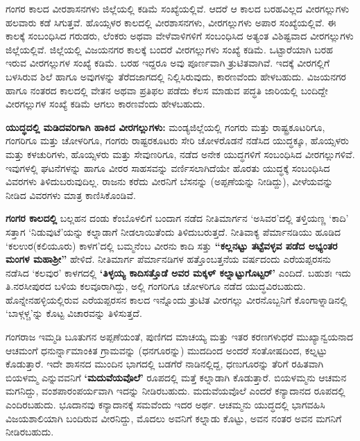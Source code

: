 ಗಂಗರ ಕಾಲದ ವೀರಶಾಸನಗಳು ಜಿಲ್ಲೆಯಲ್ಲಿ ಕಡಿಮೆ ಸಂಖ್ಯೆಯಲ್ಲಿವೆ. ಆದರೆ ಆ ಕಾಲದ ಬರಹವಿಲ್ಲದ ವೀರಗಲ್ಲುಗಳು ಹಲವಾರು ಕಡೆ ಸಿಗುತ್ತವೆ. ಹೊಯ್ಸಳರ ಕಾಲದಲ್ಲಿ ವೀರಶಾಸನಗಳು, ವೀರಗಲ್ಲುಗಳು ಅಪಾರ ಸಂಖ್ಯೆಯಲ್ಲಿವೆ. ಈ ಕಾಲಕ್ಕೆ ಸಂಬಂಧಿಸಿದ ಗರುಡರು, ಲೆಂಕರು ಅಥವಾ ವೇಳೆವಾಳಿಗಳಿಗೆ ಸಂಬಂಧಿಸಿದ ಅತ್ಯಂತ ವಿಶಿಷ್ಟವಾದ ವೀರಗಲ್ಲುಗಳು ಜಿಲ್ಲೆಯಲ್ಲಿವೆ. ಜಿಲ್ಲೆಯಲ್ಲಿ ವಿಜಯನಗರ ಕಾಲಕ್ಕೆ ಬಂದರೆ ವೀರಗಲ್ಲುಗಳು ಸಂಖ್ಯೆ ಕಡಿಮೆ. ಒಟ್ಟಾರೆಯಾಗಿ ಬರಹ ಇರುವ ವೀರಗಲ್ಲುಗಳ ಸಂಖ್ಯೆ ಕಡಿಮೆ. ಬರಹ ಇದ್ದರೂ ಅವು ಪೂರ್ಣವಾಗಿ ತ್ರುಟಿತವಾಗಿವೆ. ಇದಕ್ಕೆ ವೀರಗಲ್ಲಿಗೆ ಬಳಸಿರುವ \hbox{ಶಿಲೆ} ಹಾಗೂ ಅವುಗಳನ್ನು ತೆರೆದಜಾಗದಲ್ಲಿ ನಿಲ್ಲಿಸಿರುವುದು, ಕಾರಣವೆಂದು ಹೇಳಬಹುದು. ವಿಜಯನಗರ ಹಾಗೂ ನಂತರದ ಕಾಲದಲ್ಲಿ ವೇತನ ಅಥವಾ ಪ್ರತಿಫಲ ಪಡೆದು ಕೆಲಸ ಮಾಡುವ ಪದ್ಧತಿ ಜಾರಿಯಲ್ಲಿ ಬಂದಿದ್ದೇ ವೀರಗಲ್ಲುಗಳ ಸಂಖ್ಯೆ ಕಡಿಮೆ ಆಗಲು ಕಾರಣವೆಂದು ಹೇಳಬಹುದು.

\newpage

\textbf{ಯುದ್ಧದಲ್ಲಿ ಮಡಿದವರಿಗಾಗಿ ಹಾಕಿದ ವೀರಗಲ್ಲುಗಳು:} ಮಂಡ್ಯಜಿಲ್ಲೆಯಲ್ಲಿ ಗಂಗರು ಮತ್ತು ರಾಷ್ಟ್ರಕೂಟರಿಗೂ, ಗಂಗರಿಗೂ ಮತ್ತು ಚೋಳರಿಗೂ, ಗಂಗರು ರಾಷ್ಟರಕೂಟರು ಸೇರಿ ಚೋಳರೊಡನೆ ನಡೆಸಿದ ಯುದ್ಧಕ್ಕೂ, ಹೊಯ್ಸಳರು ಮತ್ತು ಕಳಚುರಿಗಳು, ಹೊಯ್ಸಳರು ಮತ್ತು ಸೇವುಣರಿಗೂ, ನಡೆದ ಅನೇಕ ಯುದ್ಧಗಳಿಗೆ ಸಂಬಂಧಿಸಿದ ವೀರಗಲ್ಲುಗಳಿವೆ. ಇವುಗಳಲ್ಲಿ ಘಟನೆಗಳನ್ನು ಹಾಗೂ ವೀರರ ಸಾಹಸವನ್ನು ವರ್ಣಿಸಲಾಗಿದೆಯೇ ಹೊರತು ಯುದ್ಧಕ್ಕೆ ಸಂಬಂಧಿಸಿದ ವಿವರಗಳು ತಿಳಿದುಬರುವುದಿಲ್ಲ. ರಾಜನು ಕರೆದು ವೀರನಿಗೆ ಬೆಸನನ್ನು (ಅಪ್ಪಣೆಯನ್ನು ನೀಡಿದ್ದು), ವೀಳೆಯವನ್ನು ನೀಡಿದ ವಿವರಗಳು ಮಾತ್ರ ಕಾಣಿಸಿಕೊಂಡಿವೆ.

\textbf{ಗಂಗರ ಕಾಲದಲ್ಲಿ} ಬಲ್ಲಹನ ದಂಡು ಕೆಂಬೊಳಲಿಗೆ ಬಂದಾಗ ನಡೆದ ನೀತಿಮಾರ್ಗನ ‘ಅಸಿವರ’ದಲ್ಲಿ ತಳ್ತಿಯಣ್ಣ ‘ಕಾದಿ’ ಸತ್ತಾಗ ‘ನಿಡುವುಟೆ’ಯನ್ನು ಕಲ್ನಾಡಾಗೆ ನೀಡಲಾಯಿತೆಂದು ತಿಳಿದುಬರುತ್ತದೆ. ನೀತಿವಾಕ್ಯ ಪೆರ್ಮಾನಡಿಯು ಹೂಡಿದ ‘ಕಲಉರ(ಕಲಿಯೂರು) ಕಾಳಗ’ದಲ್ಲಿ ಬಮ್ಮನೆಂಬ ವೀರನು ಕಾದಿ ಸತ್ತು \textbf{“ಕಲ್ಲನಟ್ಟು ತಟ್ಟೆವಳ್ಳವ ಪಡೆದ ಅಭ್ಯಂತರ ಮಂಗಳ ಮಹಾಶ‍್ರೀ”} ಹೇಳಿದೆ. ನೀತಿಮಾರ್ಗ ಪೆರ್ಮಾನಡಿಗಳ ಹತ್ತೊಂಬತ್ತನೆಯ ವರ್ಷದಂದು ಎರೆಯಪ್ಪರಸನು ನಡೆಸಿದ ‘ಕಲವುರ’ ಕಾಳಗದಲ್ಲಿ \textbf{‘ತಿಳ್ಳಯ್ಯ ಕಾದಿಸತ್ತೊಡೆ ಅವರ ಮಕ್ಕಳ್​ ಕಲ್ನಾಟ್ಟುಗೊಟ್ಟರ್​’} ಎಂದಿದೆ. ಬಹುಶಃ ಇದು ತಿ.ನರಸೀಪುರದ ಬಳಿಯ ಕಲವೂರಾಗಿದ್ದು, ಅಲ್ಲಿ ಗಂಗರಿಗೂ ಚೋಳರಿಗೂ ನಡೆದ ಯುದ್ಧವಿರಬಹುದು. ಹೊನ್ನೇನಹಳ್ಳಿಯಲ್ಲಿರುವ ಎರೆಯಪ್ಪರಸನ ಕಾಲದ ಇನ್ನೊಂದು ತ್ರುಟಿತ ವೀರಗಲ್ಲು ವೀರನೊಬ್ಬನಿಗೆ ಕೊಂಗಾಳ್ನಾಡಿನಲ್ಲಿ ‘ಬಾಳ್ಗಳ್ಚ’ನ್ನು ಕೊಟ್ಟ ವಿಚಾರವನ್ನು ತಿಳಿಸುತ್ತದೆ.

ಗಂಗರಾಜ ಇಮ್ಮಡಿ ಬೂತುಗನ ಅಪ್ಪಣೆಯಂತೆ, ಪುಣಿಗದ ಮಾಚಯ್ಯ ಮತ್ತು ಇತರ ಕರಣಗಳು\break ಧರೆ ಮುಖ್ಯಾನ್ವಯನಾದ ಆಚಮಂಗೆ ಧನುರ್ನ್ನಾಮಾಂಕಿತ ಗ್ರಾಮವನ್ನು (ಧನಗೂರನ್ನು) ಮುದದಿಂದ ಅಂದರೆ ಸಂತೋಷದಿಂದ, ಕಲ್ನಟ್ಟು ಕೊಡುತ್ತಾರೆ. ಇದೇ ಶಾಸನದ ಮುಂದಿನ ಭಾಗದಲ್ಲಿ ಬಡಗೆರೆ ನಾಡಿನಲ್ಲಿದ್ದ, ಧಣುಗೂರನ್ನು ತೆರಿಗೆ ರಹಿತವಾಗಿ ಬಿಯಳಮ್ಮ ಎನ್ನುವವನಿಗೆ \textbf{‘ಮದುವೆಯವೊಲೆ’} ರೂಪದಲ್ಲಿ ಮತ್ತೆ ಕಲ್ನಾಡಾಗಿ ಕೊಡುತ್ತಾರೆ. ಬಿಯಳಮ್ಮನು ಆಚಮನ ಮಗನಿದ್ದು, ವಂಶಪಾರಂಪರ್ಯವಾಗಿ ಇದನ್ನು ನೀಡಿರಬಹುದು. ಮದುವೆಯವೊಲೆ ಎಂದರೆ ಕನ್ಯಾದಾನದ ರೂಪದಲ್ಲಿ ಎಂದಿರಬಹುದು. ಭೂದಾನವು ಕನ್ಯಾದಾನಕ್ಕೆ ಸಮವೆಂದು ಇದರ ಅರ್ಥ. ಆಚಮ್ಮನು ಯುದ್ಧದಲ್ಲಿ ಭಾಗವಹಿಸಿ ವಿಜಯಶಾಲಿಯಾಗಿ ಬಂದಿರುವ ವೀರನಿದ್ದು, ಮೊದಲು ಅವನಿಗೆ ಕಲ್ನಾಡು ಕೊಟ್ಟು, ಅವನ ನಂತರ ಅವನ ಮಗನಿಗೆ ನೀಡಿರಬಹುದು.

